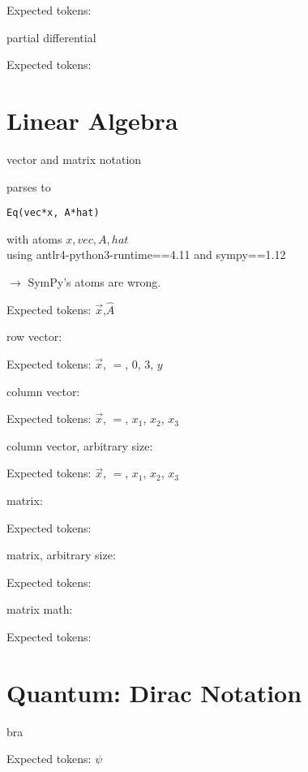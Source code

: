 \documentclass{article}
\begin{document}
\hrulefill



Expected tokens: 

\hrulefill


partial differential

Expected tokens: 

\hrulefill


\section{Linear Algebra}
vector and matrix notation
    
parses to
\begin{verbatim}
Eq(vec*x, A*hat)
\end{verbatim}
with atoms ${x, vec, A, hat}$\\
using antlr4-python3-runtime==4.11 and sympy==1.12

$\rightarrow$ SymPy's atoms are wrong.

Expected tokens: $\vec{x}$,$\hat{A}$

\hrulefill



row vector:

Expected tokens: $\vec{x}$, $=$, $0$, $3$, $y$

\hrulefill


column vector:

Expected tokens: $\vec{x}$, $=$, $x_1$, $x_2$, $x_3$

\hrulefill


column vector, arbitrary size:

Expected tokens: $\vec{x}$, $=$, $x_1$, $x_2$, $x_3$

\hrulefill



matrix:

Expected tokens: 

\hrulefill


matrix, arbitrary size:

Expected tokens: 

\hrulefill


matrix math:

Expected tokens: 

\hrulefill


\section{Quantum: Dirac Notation}

bra

Expected tokens: $\psi$
\end{document}
